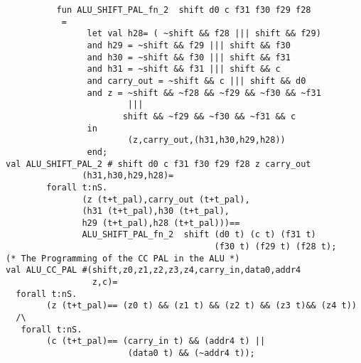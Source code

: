 \begin{verbatim}
          fun ALU_SHIFT_PAL_fn_2  shift d0 c f31 f30 f29 f28
           =
                let val h28= ( ~shift && f28 ||| shift && f29) 
                and h29 = ~shift && f29 ||| shift && f30
                and h30 = ~shift && f30 ||| shift && f31
                and h31 = ~shift && f31 ||| shift && c
                and carry_out = ~shift && c ||| shift && d0
                and z = ~shift && ~f28 && ~f29 && ~f30 && ~f31
                        |||
                       shift && ~f29 && ~f30 && ~f31 && c
                in
                        (z,carry_out,(h31,h30,h29,h28))
                end;
val ALU_SHIFT_PAL_2 # shift d0 c f31 f30 f29 f28 z carry_out 
               (h31,h30,h29,h28)=
        forall t:nS.
               (z (t+t_pal),carry_out (t+t_pal),
               (h31 (t+t_pal),h30 (t+t_pal),
               h29 (t+t_pal),h28 (t+t_pal)))==
               ALU_SHIFT_PAL_fn_2  shift (d0 t) (c t) (f31 t) 
                                         (f30 t) (f29 t) (f28 t);
(* The Programming of the CC PAL in the ALU *)
val ALU_CC_PAL #(shift,z0,z1,z2,z3,z4,carry_in,data0,addr4
                 z,c)=
  forall t:nS.
        (z (t+t_pal)== (z0 t) && (z1 t) && (z2 t) && (z3 t)&& (z4 t))
  /\
   forall t:nS.
        (c (t+t_pal)== (carry_in t) && (addr4 t) ||
                        (data0 t) && (~addr4 t));
\end{verbatim}
